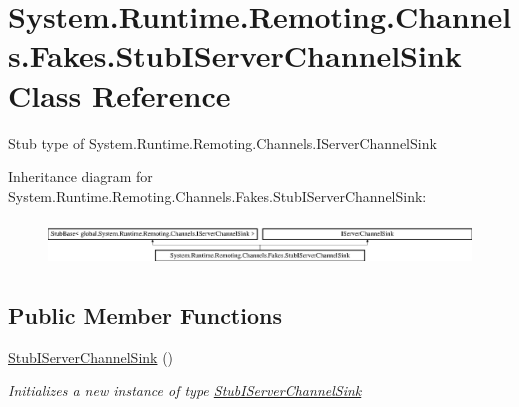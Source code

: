 \hypertarget{class_system_1_1_runtime_1_1_remoting_1_1_channels_1_1_fakes_1_1_stub_i_server_channel_sink}{\section{System.\-Runtime.\-Remoting.\-Channels.\-Fakes.\-Stub\-I\-Server\-Channel\-Sink Class Reference}
\label{class_system_1_1_runtime_1_1_remoting_1_1_channels_1_1_fakes_1_1_stub_i_server_channel_sink}
}


Stub type of System.\-Runtime.\-Remoting.\-Channels.\-I\-Server\-Channel\-Sink 


Inheritance diagram for System.\-Runtime.\-Remoting.\-Channels.\-Fakes.\-Stub\-I\-Server\-Channel\-Sink\-:\begin{figure}[H]
\begin{center}
\leavevmode
\includegraphics[height=1.238938cm]{class_system_1_1_runtime_1_1_remoting_1_1_channels_1_1_fakes_1_1_stub_i_server_channel_sink}
\end{center}
\end{figure}
\subsection*{Public Member Functions}
\begin{DoxyCompactItemize}
\item 
\hyperlink{class_system_1_1_runtime_1_1_remoting_1_1_channels_1_1_fakes_1_1_stub_i_server_channel_sink_a813e276311b37657557f3e4c72af9437}{Stub\-I\-Server\-Channel\-Sink} ()
\begin{DoxyCompactList}\small\item\em Initializes a new instance of type \hyperlink{class_system_1_1_runtime_1_1_remoting_1_1_channels_1_1_fakes_1_1_stub_i_server_channel_sink}{Stub\-I\-Server\-Channel\-Sink}\end{DoxyCompactList}\end{DoxyCompactItemize}
